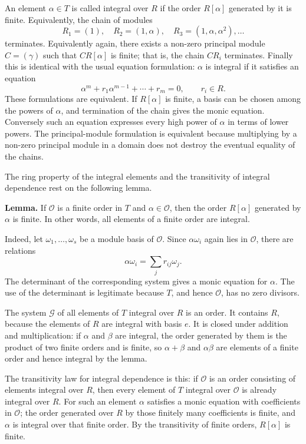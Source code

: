 \documentclass[11pt]{article}
\begin{document}
An element $\alpha\in T$ is called integral over $R$ if the order $R[\alpha]$ generated by it is finite. Equivalently, the chain of modules
\[
  R_1=(1),\quad R_2=(1,\alpha),\quad R_3=(1,\alpha,\alpha^2),\ldots
\]
terminates. Equivalently again, there exists a non-zero principal module $C=(\gamma)$ such that $C R[\alpha]$ is finite; that is, the chain $C R_i$ terminates. Finally this is identical with the usual equation formulation: $\alpha$ is integral if it satisfies an equation
\[
  \alpha^m+r_1\alpha^{m-1}+\cdots+r_m=0,
  \qquad r_i\in R.
\]
These formulations are equivalent. If $R[\alpha]$ is finite, a basis can be chosen among the powers of $\alpha$, and termination of the chain gives the monic equation. Conversely such an equation expresses every high power of $\alpha$ in terms of lower powers. The principal-module formulation is equivalent because multiplying by a non-zero principal module in a domain does not destroy the eventual equality of the chains.

The ring property of the integral elements and the transitivity of integral dependence rest on the following lemma.

\textbf{Lemma.} If $\mathcal O$ is a finite order in $T$ and $\alpha\in\mathcal O$, then the order $R[\alpha]$ generated by $\alpha$ is finite. In other words, all elements of a finite order are integral.

Indeed, let $\omega_1,\ldots,\omega_s$ be a module basis of $\mathcal O$. Since $\alpha\omega_i$ again lies in $\mathcal O$, there are relations
\[
  \alpha\omega_i=\sum_j r_{ij}\omega_j.
\]
The determinant of the corresponding system gives a monic equation for $\alpha$. The use of the determinant is legitimate because $T$, and hence $\mathcal O$, has no zero divisors.

The system $\mathcal G$ of all elements of $T$ integral over $R$ is an order. It contains $R$, because the elements of $R$ are integral with basis $e$. It is closed under addition and multiplication: if $\alpha$ and $\beta$ are integral, the order generated by them is the product of two finite orders and is finite, so $\alpha+\beta$ and $\alpha\beta$ are elements of a finite order and hence integral by the lemma.

The transitivity law for integral dependence is this: if $\mathcal O$ is an order consisting of elements integral over $R$, then every element of $T$ integral over $\mathcal O$ is already integral over $R$. For such an element $\alpha$ satisfies a monic equation with coefficients in $\mathcal O$; the order generated over $R$ by those finitely many coefficients is finite, and $\alpha$ is integral over that finite order. By the transitivity of finite orders, $R[\alpha]$ is finite.
\end{document}
